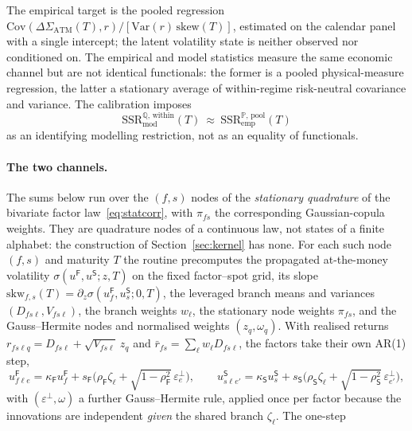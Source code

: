 \documentclass[11pt]{article}
\newcommand{\SSR}{\mathrm{SSR}}
\providecommand{\Prob}{\mathbb{P}}
\providecommand{\Qmeas}{\mathbb{Q}}
\providecommand{\1}{\mathbf 1}
\begin{document}
\noindent
The empirical target is the pooled regression
$\mathrm{Cov}(\Delta\Sigma_{\mathrm{ATM}}(T),r)/[\mathrm{Var}(r)\,\mathrm{skew}(T)]$, estimated on
the calendar panel with a single intercept; the latent volatility state is neither observed nor
conditioned on. The empirical and model statistics measure the same economic channel but are not identical
functionals: the former is a pooled physical-measure regression, the latter a stationary average of
within-regime risk-neutral covariance and variance. The calibration imposes
\[
  \SSR^{\Qmeas,\,\mathrm{within}}_{\mathrm{mod}}(T)\ \approx\
  \SSR^{\Prob,\,\mathrm{pool}}_{\mathrm{emp}}(T)
\]
as an identifying modelling restriction, not as an equality of functionals.

\paragraph{The two channels.} The sums below run over the $(f,s)$ nodes of the \emph{stationary
quadrature} of the bivariate factor law~\eqref{eq:statcorr}, with $\pi_{fs}$ the corresponding
Gaussian-copula weights. They are quadrature nodes of a continuous law, not states of a finite
alphabet: the construction of Section~\ref{sec:kernel} has none. For each such node $(f,s)$ and
maturity $T$ the routine
precomputes the propagated at-the-money volatility $\sigma(u^{\mathsf F},u^{\mathsf S};z,T)$ on the
fixed factor--spot grid, its slope
$\mathrm{skw}_{f,s}(T)=\partial_z\sigma(u^{\mathsf F}_f,u^{\mathsf S}_s;0,T)$, the leveraged branch means and
variances $(D_{f s\ell},V_{f s\ell})$, the branch weights $w_\ell$, the stationary node weights
$\pi_{f s}$, and the Gauss--Hermite nodes and normalised weights $(z_q,\omega_q)$. With realised
returns $r_{f s\ell q}=D_{f s\ell}+\sqrt{V_{f s\ell}}\,z_q$ and
$\bar r_{f s}=\sum_\ell w_\ell D_{f s\ell}$, the factors take their own \textup{AR(1)} step,
\begin{equation}\label{eq:ustep}
  u^{\mathsf F}_{f\ell e}=\kappa_{\mathsf F}u^{\mathsf F}_f
    +s_{\mathsf F}\bigl(\rho_{\mathsf F}\zeta_\ell
      +\sqrt{1-\rho_{\mathsf F}^{2}}\,\varepsilon^{\perp}_{e}\bigr),
  \qquad
  u^{\mathsf S}_{s\ell e'}=\kappa_{\mathsf S}u^{\mathsf S}_s
    +s_{\mathsf S}\bigl(\rho_{\mathsf S}\zeta_\ell
      +\sqrt{1-\rho_{\mathsf S}^{2}}\,\varepsilon^{\perp}_{e'}\bigr),
\end{equation}
with $(\varepsilon^{\perp},\omega)$ a further Gauss--Hermite rule, applied once per factor because
the innovations are independent \emph{given} the shared branch $\zeta_\ell$. The one-step
\end{document}
